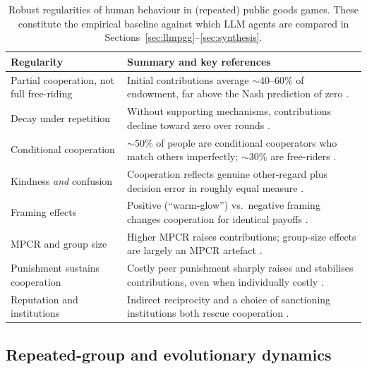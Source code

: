 \documentclass[11pt,a4paper]{article}
\begin{document}
\begin{table}[t]
\centering
\small
\caption{Robust regularities of human behaviour in (repeated) public goods
games. These constitute the empirical baseline against which LLM agents are
compared in Sections~\ref{sec:llmpgg}--\ref{sec:synthesis}.}
\label{tab:facts}
\begin{tabularx}{\textwidth}{@{}p{} Y@{}}
\toprule
\textbf{Regularity} & \textbf{Summary and key references} \\
\midrule
Partial cooperation, not full free-riding &
Initial contributions average $\sim$40--60\% of endowment, far above the Nash
prediction of zero \citep{ledyard1995public,zelmer2003linear}. \\
Decay under repetition &
Without supporting mechanisms, contributions decline toward zero over rounds
\citep{isaac1988groupsize,andreoni1988free}. \\
Conditional cooperation &
$\sim$50\% of people are conditional cooperators who match others imperfectly;
$\sim$30\% are free-riders \citep{fischbacher2001conditional,fischbacher2010social}. \\
Kindness \emph{and} confusion &
Cooperation reflects genuine other-regard plus decision error in roughly equal
measure \citep{andreoni1995kindness,houser2002revisiting}. \\
Framing effects &
Positive (``warm-glow'') vs.\ negative framing changes cooperation for identical
payoffs \citep{andreoni1995warmglow}. \\
MPCR and group size &
Higher MPCR raises contributions; group-size effects are largely an MPCR artefact
\citep{isaac1988groupsize,isaac1994groupsize}. \\
Punishment sustains cooperation &
Costly peer punishment sharply raises and stabilises contributions, even when
individually costly \citep{fehr2000cooperation,fehr2002altruistic}. \\
Reputation and institutions &
Indirect reciprocity and a choice of sanctioning institutions both rescue
cooperation \citep{milinski2002reputation,gurerk2006competitive,rockenbach2006efficient}. \\
\bottomrule
\end{tabularx}
\end{table}

\subsection{Repeated-group and evolutionary dynamics}
\label{subsec:evo}
\end{document}
